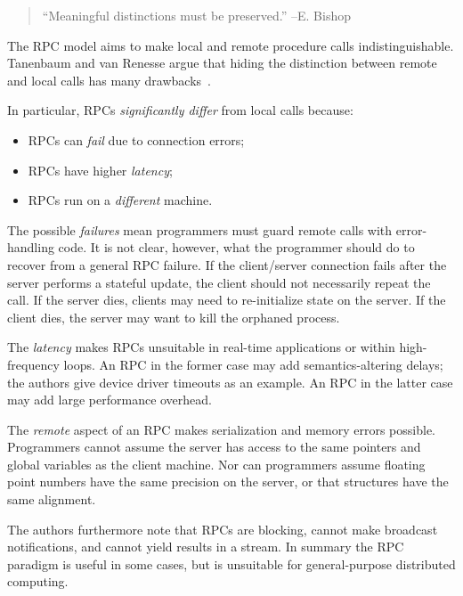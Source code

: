 \documentclass{article}
\begin{document}


\begin{quote}
  ``Meaningful distinctions must be preserved.'' --E. Bishop
\end{quote}

The RPC model aims to make local and remote procedure calls indistinguishable.
Tanenbaum and van Renesse argue that hiding the distinction between remote and local calls has many drawbacks~\cite{tv-euteco-1988}.

In particular, RPCs \emph{significantly differ} from local calls because:

\begin{itemize}
\item RPCs can \emph{fail} due to connection errors;
\item RPCs have higher \emph{latency};
\item RPCs run on a \emph{different} machine.
\end{itemize}

The possible \emph{failures} mean programmers must guard remote calls with error-handling code.
It is not clear, however, what the programmer should do to recover from a general RPC failure.
If the client/server connection fails after the server performs a stateful update, the client should not necessarily repeat the call.
If the server dies, clients may need to re-initialize state on the server.
If the client dies, the server may want to kill the orphaned process.

The \emph{latency} makes RPCs unsuitable in real-time applications or within high-frequency loops.
An RPC in the former case may add semantics-altering delays; the authors give device driver timeouts as an example.
An RPC in the latter case may add large performance overhead.

The \emph{remote} aspect of an RPC makes serialization and memory errors possible.
Programmers cannot assume the server has access to the same pointers and global variables as the client machine.
Nor can programmers assume floating point numbers have the same precision on the server, or that structures have the same alignment.

The authors furthermore note that RPCs are blocking, cannot make broadcast notifications, and cannot yield results in a stream.
In summary the RPC paradigm is useful in some cases, but is unsuitable for general-purpose distributed computing.


\footnotesize


\end{document}
